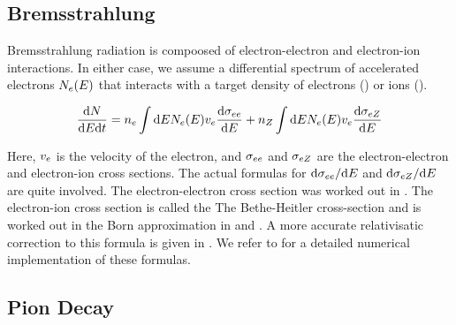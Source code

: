 \subsection{Bremsstrahlung}

Bremsstrahlung radiation is compoosed of electron-electron and electron-ion interactions.
In either case, 
we assume a 
differential spectrum of accelerated electrons $N_e(E)$ 
that interacts with a target density of electrons (\ElectronDensity) or ions (\IonDensity).

\begin{equation}
  \frac{\text{d} N}{\text{d}E\text{d}t} =
  n_e \int \text{d}E
  N_e(E) v_e
  \frac{\text{d}\sigma_{ee}}{\text{d}E} +
  n_Z \int \text{d}E
  N_e(E) v_e
  \frac{\text{d}\sigma_{eZ}}{\text{d}E}
\end{equation}

Here, $v_e$ is the velocity of the
electron, and $\sigma_{ee}$ and
$\sigma_{eZ}$ are the electron-electron and
electron-ion cross sections.
The actual formulas for 
$\text{d}\sigma_{ee}/\text{d}E$
and 
$\text{d}\sigma_{eZ}/\text{d}E$
are quite involved.  The electron-electron cross section was worked out
in \cite{haug_1975a_bremsstrahlung-production}.  The electron-ion cross
section is called the The Bethe-Heitler cross-section and is worked
out in the Born approximation in \cite{heitler_1953a_quantum-theory}
and \cite{koch_1959a_bremsstrahlung-cross-section}.  A more
accurate relativisatic correction to this formula is given in
\cite{haug_1997a_nonrelativistic-bremsstrahlung}.  We refer
to \cite{houck_2006a_models-nonthermal} for a detailed numerical
implementation of these formulas.

\subsection{Pion Decay}

